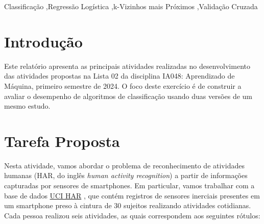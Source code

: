 \documentclass[final,5p]{elsarticle}
\numberwithin{equation}{section}
\begin{document}
\begin{frontmatter}

\begin{keyword}
    Classificação \sep Regressão Logística \sep k-Vizinhos mais Próximos \sep Validação Cruzada



\end{keyword}

\end{frontmatter}

\section{Introdução}

    Este relatório apresenta as principais atividades realizadas no desenvolvimento das atividades propostas na Lista 02 da disciplina IA048: Aprendizado de Máquina, primeiro semestre de 2024. O foco deste exercício é de construir a avaliar o desempenho de algoritmos de classificação usando duas versões de um mesmo estudo.

\section{Tarefa Proposta}

    Nesta atividade, vamos abordar o problema de reconhecimento de atividades humanas (HAR, do inglês \emph{human activity recognition}) a partir de informações capturadas por sensores de smartphones. Em particular, vamos trabalhar com a base de dados \href{https://archive.ics.uci.edu/dataset/240/human+activity+recognition+using+smartphones}{UCI HAR} \cite{anguita2013public}, que contém registros de sensores inerciais presentes em um smartphone preso à cintura de 30 sujeitos realizando atividades cotidianas. Cada pessoa realizou seis atividades, as quais correspondem aos seguintes rótulos:
\end{document}
